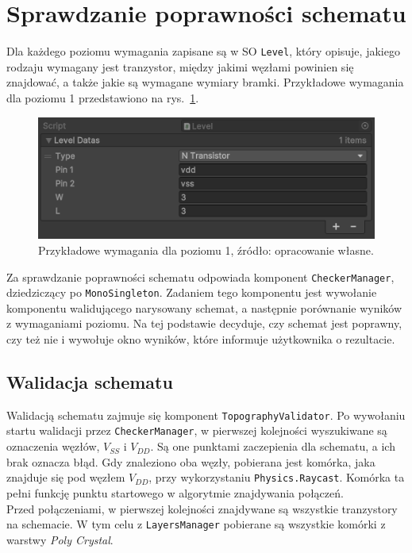 \section{Sprawdzanie poprawności schematu}
\label{sec:sprawdzanie_poprawnosci_schematu}

Dla każdego poziomu wymagania zapisane są w SO \texttt{Level}, który opisuje,
jakiego rodzaju wymagany jest tranzystor,
między jakimi węzłami powinien się znajdować,
a także jakie są wymagane wymiary bramki.
Przykładowe wymagania dla poziomu 1 przedstawiono na rys.~\ref{fig:level1_requirements}.

\begin{figure}[h]
    \centering
    \includegraphics[width=.9\textwidth]{chapters/chapter4/rys/level}
    \caption[Przykładowe wymagania dla poziomu 1.]
    {Przykładowe wymagania dla poziomu 1, źródło: opracowanie własne.}
    \label{fig:level1_requirements}
\end{figure}

Za sprawdzanie poprawności schematu odpowiada komponent \texttt{CheckerManager}, dziedziczący po \texttt{MonoSingleton}.
Zadaniem tego komponentu jest wywołanie komponentu walidującego narysowany schemat,
a następnie porównanie wyników z wymaganiami poziomu.
Na tej podstawie decyduje, czy schemat jest poprawny, czy też nie
i wywołuje okno wyników, które informuje użytkownika o rezultacie.

\subsection{Walidacja schematu}
\label{subsec:walidacja_schematu}

Walidacją schematu zajmuje się komponent \texttt{TopographyValidator}.
Po wywołaniu startu walidacji przez \texttt{CheckerManager},
w pierwszej kolejności wyszukiwane są oznaczenia węzłów, $V_{SS}$ i $V_{DD}$.
Są one punktami zaczepienia dla schematu, a ich brak oznacza błąd.
Gdy znaleziono oba węzły, pobierana jest komórka, jaka znajduje się pod węzłem $V_{DD}$,
przy wykorzystaniu \texttt{Physics.Raycast}.
Komórka ta pełni funkcję punktu startowego w algorytmie znajdywania połączeń.\\
\indent Przed połączeniami, w pierwszej kolejności znajdywane są wszystkie tranzystory na schemacie.
W tym celu z \texttt{LayersManager} pobierane są wszystkie komórki z warstwy \textit{Poly Crystal}.
